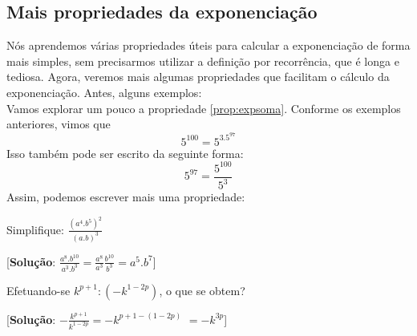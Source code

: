 \subsection{Mais propriedades da exponenciação}
Nós aprendemos várias propriedades úteis para calcular a exponenciação de forma mais simples, sem precisarmos utilizar a definição por recorrência, que é longa e tediosa. Agora, veremos mais algumas propriedades que facilitam o cálculo da exponenciação. Antes, alguns exemplos:
\\
Vamos explorar um pouco a propriedade \ref{prop:expsoma}. Conforme os exemplos anteriores, vimos que $$5^{100}=5^3.5^{97}$$Isso também pode ser escrito da seguinte forma:$$5^{97}=\frac{5^{100}}{5^3}$$Assim, podemos escrever mais uma propriedade:
\begin{inlinexer}
Simplifique: $\frac{(a^4.b^5)^2}{(a.b)^3}$
\begin{flushright}
\tiny[\textbf{Solução}: $\frac{a^8.b^{10}}{a^3.b^3}=\frac{a^8}{a^3}\frac{b^{10}}{b^3}=a^5.b^7$]
\end{flushright}
\end{inlinexer}
\begin{inlinexer} Efetuando-se $k^{p+1}:(-k^{1-2p})$, o que se obtem?
\begin{flushright}
\footnotesize[\textbf{Solução}: $-\frac{k^{p+1}}{k^{1-2p}} = -k^{p+1 -(1-2p)}$ $=-k^{3p}$]
\end{flushright}
\end{inlinexer}
